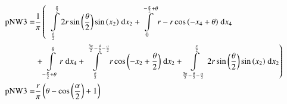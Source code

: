 \begin{align}
    \mathrm{pNW3} =&\frac{1}{\pi} \left(\;\;\int\limits_{\frac{\theta}{2}}^{\frac{\pi}{2}}2 r \sin{\left (\frac{\theta}{2} \right )} \sin{\left (x_{2} \right )}\;\mathrm{d}x_{2}+\int\limits_{0}^{- \frac{\pi}{2} + \theta}r - r \cos{\left (- x_{4} + \theta \right )}\;\mathrm{d}x_{4}\right.\notag\\
 &\left.+\int\limits_{- \frac{\pi}{2} + \theta}^{\theta}r\;\mathrm{d}x_{4}+\int\limits_{\frac{\theta}{2}}^{\frac{3 \pi}{2} - \frac{\theta}{2} - \frac{\alpha}{2}}r \cos{\left (- x_{2} + \frac{\theta}{2} \right )}\;\mathrm{d}x_{2}+\int\limits_{\frac{3 \pi}{2} - \frac{\theta}{2} - \frac{\alpha}{2}}^{\frac{\pi}{2}}2 r \sin{\left (\frac{\theta}{2} \right )} \sin{\left (x_{2} \right )}\;\mathrm{d}x_{2}\right)\label{pNW3Def}\\
    \mathrm{pNW3} =& \frac{r}{\pi} \left(\theta - \cos{\left (\frac{\alpha}{2} \right )} + 1\right)\label{pNW3Sln}
\end{align}